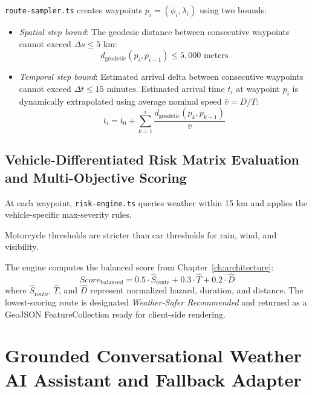 \texttt{route-sampler.ts} creates waypoints $p_i=(\phi_i,\lambda_i)$ using two bounds:
\begin{itemize}
    \item[-] \textit{Spatial step bound}: The geodesic distance between consecutive waypoints cannot exceed $\Delta s \le 5\text{ km}$:
    \begin{equation}
    \label{eq:spatial_step_bound_en}
    d_{\text{geodetic}}(p_i, p_{i-1}) \le 5,000\text{ meters}
    \end{equation}
    \item[-] \textit{Temporal step bound}: Estimated arrival delta between consecutive waypoints cannot exceed $\Delta t \le 15\text{ minutes}$. Estimated arrival time $t_i$ at waypoint $p_i$ is dynamically extrapolated using average nominal speed $\bar{v} = D / T$:
    \begin{equation}
    \label{eq:eta_extrapolation_en}
    t_i = t_0 + \sum_{k=1}^i \frac{d_{\text{geodetic}}(p_k, p_{k-1})}{\bar{v}}
    \end{equation}
\end{itemize}

\subsection{Vehicle-Differentiated Risk Matrix Evaluation and Multi-Objective Scoring}
At each waypoint, \texttt{risk-engine.ts} queries weather within 15 km and applies the vehicle-specific max-severity rules.

Motorcycle thresholds are stricter than car thresholds for rain, wind, and visibility.

The engine computes the balanced score from Chapter~\ref{ch:architecture}:
\begin{equation}
Score_{\text{balanced}} = 0.5 \cdot \hat{S}_{\text{route}} + 0.3 \cdot \hat{T} + 0.2 \cdot \hat{D}
\end{equation}
where $\hat{S}_{\text{route}}$, $\hat{T}$, and $\hat{D}$ represent normalized hazard, duration, and distance. The lowest-scoring route is designated \textit{Weather-Safer Recommended} and returned as a GeoJSON FeatureCollection ready for client-side rendering.

\section{Grounded Conversational Weather AI Assistant and Fallback Adapter}
\label{sec:grounded_ai_impl}

